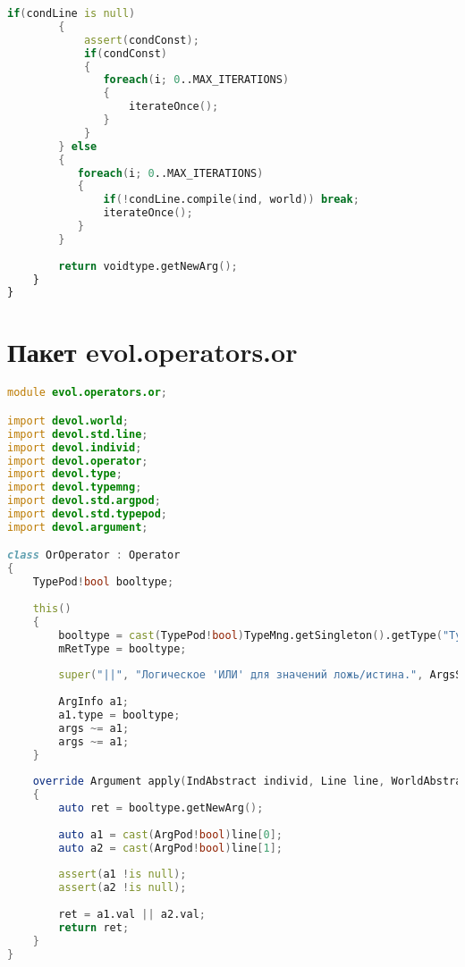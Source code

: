 \documentclass[russian,utf8,emptystyle]{eskdtext}
\begin{document}
\begin{lstlisting}[language=D]
        if(condLine is null)
        {
            assert(condConst);
            if(condConst)
            {
               foreach(i; 0..MAX_ITERATIONS)
               {
                   iterateOnce();
               }
            }
        } else
        {
           foreach(i; 0..MAX_ITERATIONS)
           {
               if(!condLine.compile(ind, world)) break;
               iterateOnce();
           }
        }
        
        return voidtype.getNewArg();
    }   
}

\end{lstlisting}

\section{Пакет evol.operators.or}
\begin{lstlisting}[language=D]
module evol.operators.or;

import devol.world;
import devol.std.line;
import devol.individ;
import devol.operator;
import devol.type;
import devol.typemng;
import devol.std.argpod;
import devol.std.typepod;
import devol.argument;

class OrOperator : Operator
{
    TypePod!bool booltype;
    
    this()
    {
        booltype = cast(TypePod!bool)TypeMng.getSingleton().getType("Typebool");
        mRetType = booltype;
        
        super("||", "Логическое 'ИЛИ' для значений ложь/истина.", ArgsStyle.BINAR_STYLE);
        
        ArgInfo a1;
        a1.type = booltype;
        args ~= a1;
        args ~= a1;
    }
    
    override Argument apply(IndAbstract individ, Line line, WorldAbstract world)
    {
        auto ret = booltype.getNewArg();
        
        auto a1 = cast(ArgPod!bool)line[0];
        auto a2 = cast(ArgPod!bool)line[1];
        
        assert(a1 !is null);
        assert(a2 !is null);
        
        ret = a1.val || a2.val;
        return ret;
    }
}
\end{lstlisting}
\end{document}
